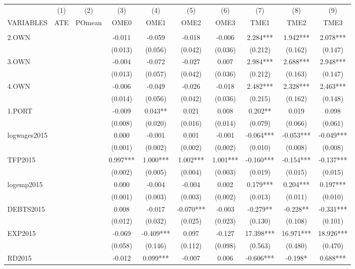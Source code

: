\documentclass[]{article}
\begin{document}
\begin{tabular}{lccccccccc} \hline
 & (1) & (2) & (3) & (4) & (5) & (6) & (7) & (8) & (9) \\
VARIABLES & ATE & POmean & OME0 & OME1 & OME2 & OME3 & TME1 & TME2 & TME3 \\ \hline
 &  &  &  &  &  &  &  &  &  \\
2.OWN &  &  & -0.011 & -0.059 & -0.018 & -0.006 & 2.284*** & 1.942*** & 2.078*** \\
 &  &  & (0.013) & (0.056) & (0.042) & (0.036) & (0.212) & (0.162) & (0.147) \\
3.OWN &  &  & -0.004 & -0.072 & -0.027 & 0.007 & 2.984*** & 2.688*** & 2.948*** \\
 &  &  & (0.013) & (0.057) & (0.042) & (0.036) & (0.212) & (0.163) & (0.147) \\
4.OWN &  &  & -0.006 & -0.049 & -0.026 & -0.018 & 2.482*** & 2.328*** & 2.463*** \\
 &  &  & (0.014) & (0.056) & (0.042) & (0.036) & (0.215) & (0.162) & (0.148) \\
1.PORT &  &  & -0.009 & 0.043** & 0.021 & 0.008 & 0.202** & 0.019 & 0.098 \\
 &  &  & (0.008) & (0.020) & (0.016) & (0.014) & (0.079) & (0.066) & (0.061) \\
logwages2015 &  &  & 0.000 & -0.001 & 0.001 & -0.001 & -0.064*** & -0.053*** & -0.049*** \\
 &  &  & (0.001) & (0.002) & (0.002) & (0.002) & (0.010) & (0.008) & (0.008) \\
TFP2015 &  &  & 0.997*** & 1.000*** & 1.002*** & 1.001*** & -0.160*** & -0.154*** & -0.137*** \\
 &  &  & (0.002) & (0.005) & (0.004) & (0.003) & (0.019) & (0.015) & (0.015) \\
logemp2015 &  &  & 0.000 & -0.004 & -0.004 & 0.002 & 0.179*** & 0.204*** & 0.197*** \\
 &  &  & (0.001) & (0.003) & (0.003) & (0.002) & (0.013) & (0.011) & (0.010) \\
DEBTS2015 &  &  & 0.008 & -0.017 & -0.070*** & -0.003 & -0.279** & -0.228** & -0.331*** \\
 &  &  & (0.012) & (0.032) & (0.025) & (0.023) & (0.130) & (0.108) & (0.101) \\
EXP2015 &  &  & -0.069 & -0.409*** & 0.097 & -0.127 & 17.398*** & 16.971*** & 18.926*** \\
 &  &  & (0.058) & (0.146) & (0.112) & (0.098) & (0.563) & (0.480) & (0.470) \\
RD2015 &  &  & -0.012 & 0.099*** & -0.007 & 0.006 & -0.606*** & -0.198* & 0.688*** \\

\end{tabular}
\end{document}

